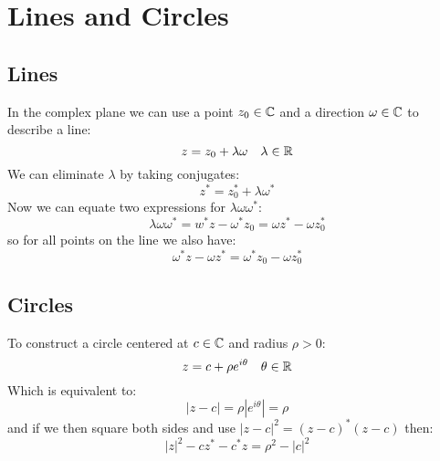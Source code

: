 \documentclass[../main.tex]{subfiles}
\begin{document}
\section{Lines and Circles}
\subsection{Lines}
In the complex plane we can use a point $z_0 \in \mathbb{C}$ and a direction $\omega \in \mathbb{C}$ to describe a line:
\[
  z = z_0 + \lambda \omega \quad \lambda \in \mathbb{R}
\]
We can eliminate $\lambda$ by taking conjugates:
\[
  z^{*} = z^{*}_{0} + \lambda \omega^{*}
\]
Now we can equate two expressions for $\lambda \omega \omega^{*}$:
\[
  \lambda \omega \omega^{*} = w^{*}z - \omega^{*}z_0 = \omega z^{*} - \omega z^{*}_{0}
\]
so for all points on the line we also have:
\[
  \omega^{*}z - \omega z^{*} = \omega^{*} z_0 - \omega z^{*}_{0}
\]
\subsection{Circles}
To construct a circle centered at $c \in \mathbb{C}$ and radius $\rho > 0$:
\[
  z = c + \rho e^{i\theta} \quad \theta \in \mathbb{R}
\]
Which is equivalent to:
\[
  |z - c| = \rho |e^{i\theta}| = \rho
\]
and if we then square both sides and use $|z-c|^2 = (z - c)^{*}(z - c)$ then:
\[
  |z|^2 - cz^{*}  - c^{*} z = \rho^2 - |c|^2
\]
\end{document}
